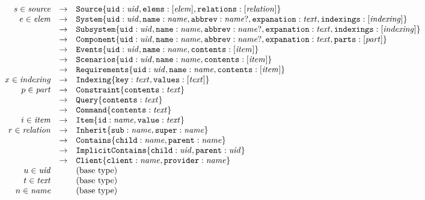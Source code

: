 \documentclass{article}
\begin{document}
\[
\begin{array}{rcl}
  s \in \mathit{source} & \rightarrow &\texttt{Source}\{\texttt{uid}:\mathit{uid},\texttt{elems}:[{\mathit{elem}}], \texttt{relations}:[{\mathit{relation}}]\} \\
  e \in \mathit{elem} & \rightarrow & \texttt{System}\{\texttt{uid}:\mathit{uid},\texttt{name}:\mathit{name},\texttt{abbrev}:{\mathit{name}}?,
                                                \texttt{expanation}:\mathit{text},\texttt{indexings}:[{\mathit{indexing}}]\} \\
                  & \rightarrow & \texttt{Subsystem}\{\texttt{uid}:\mathit{uid},\texttt{name}:\mathit{name},\texttt{abbrev}:{\mathit{name}}?,
                                                \texttt{expanation}:\mathit{text},\texttt{indexings}:[{\mathit{indexing}}]\} \\
                  & \rightarrow &\texttt{Component}\{\texttt{uid}:\mathit{uid},\texttt{name}:\mathit{name},\texttt{abbrev}:{\mathit{name}}?,
                                                \texttt{expanation}:\mathit{text},\texttt{parts}:[{\mathit{part}}]\} \\
                  & \rightarrow & \texttt{Events}\{\texttt{uid}:\mathit{uid},\texttt{name}:\mathit{name},\texttt{contents}:[{\mathit{item}}]\} \\
                  & \rightarrow & \texttt{Scenarios}\{\texttt{uid}:\mathit{uid},\texttt{name}:\mathit{name},\texttt{contents}:[{\mathit{item}}]\} \\
                  & \rightarrow & \texttt{Requirements}\{\texttt{uid}:\mathit{uid},\texttt{name}:\mathit{name},\texttt{contents}:[{\mathit{item}}]\} \\
  x \in \mathit{indexing} & \rightarrow & \texttt{Indexing}\{\texttt{key}:\mathit{text},\texttt{values}:[{\mathit{text}}]\} \\
  p \in \mathit{part} & \rightarrow & \texttt{Constraint}\{\texttt{contents}:\mathit{text}\} \\
                  & \rightarrow & \texttt{Query}\{\texttt{contents}:\mathit{text}\} \\
                  & \rightarrow & \texttt{Command}\{\texttt{contents}:\mathit{text}\} \\
  i \in \mathit{item} & \rightarrow & \texttt{Item}\{\texttt{id}:\mathit{name},\texttt{value}:\mathit{text}\} \\
  r \in \mathit{relation} & \rightarrow & \texttt{Inherit}\{\texttt{sub}:\mathit{name},\texttt{super}:\mathit{name}\} \\
                      & \rightarrow & \texttt{Contains}\{\texttt{child}:\mathit{name},\texttt{parent}:\mathit{name}\} \\
                      & \rightarrow & \texttt{ImplicitContains}\{\texttt{child}:\mathit{uid},\texttt{parent}:\mathit{uid}\} \\
                      & \rightarrow & \texttt{Client}\{\texttt{client}:\mathit{name},\texttt{provider}:\mathit{name}\} \\
  u \in \mathit{uid} & & \text{(base type)} \\
  t \in \mathit{text}& & \text{(base type)} \\
  n \in \mathit{name}& & \text{(base type)} \\
\end{array}
\]
  
\end{document}
